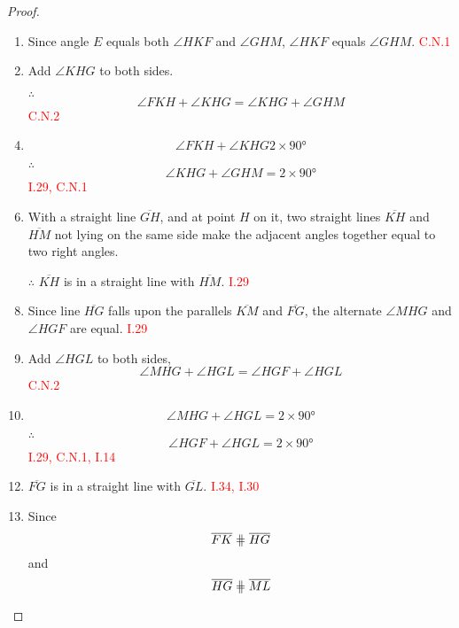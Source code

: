 \begin{proof}
\begin{enumerate}
    \item Since angle $E$ equals both $\angle{HKF}$ and $\angle{GHM}$, $\angle{HKF}$ equals $\angle{GHM}$.\hfill\textcolor{red}{ C.N.1}
    
    \item Add $\angle{KHG}$ to both sides. 
    
    \item[$\therefore$] 
    \[\angle{FKH} + \angle{KHG} = \angle{KHG} + \angle{GHM}\]\hfill\textcolor{red}{ C.N.2}
    
   \item \[\angle{FKH} + \angle{KHG} 2\times\ang{90} \]
   
   \item[$\therefore$]
   \[\angle{KHG} + \angle{GHM} =2\times\ang{90}\]\hfill\textcolor{red}{ I.29, C.N.1}
 
 \clearpage
   
    \item With a straight line $\overline{GH}$, and at point $H$ on it, two straight lines $\overline{KH}$ and $\overline{HM}$ not lying on the same side make the adjacent angles together equal to two right angles. 
    
    \item[$\therefore$] $\overline{KH}$ is in a straight line with $\overline{HM}$.\hfill\textcolor{red}{ I.29}
    
    \item Since line $\overline{HG}$ falls upon the parallels $\overline{KM}$ and $\overline{FG}$, the alternate $\angle{MHG}$ and $\angle{HGF}$ are equal.\hfill\textcolor{red}{ I.29}
    
  \item Add $\angle{HGL}$ to both sides,
  \[\angle{MHG} + \angle{HGL} = \angle{HGF} + \angle{HGL}\]\hfill\textcolor{red}{C.N.2}
  
  \item \[\angle{MHG} + \angle{HGL} = 2\times\ang{90}\]
  
  \item[$\therefore$]
   \[\angle{HGF} + \angle{HGL} =2\times\ang{90}\]\hfill\textcolor{red}{ I.29, C.N.1, I.14}
   
    \item $\overline{FG}$ is in a straight line with $\overline{GL}$.\hfill\textcolor{red}{ I.34, I.30}
    
    \item Since \[\overline{FK} \eqparallel \overline{HG}\] 
    and 
    \[\overline{HG} \eqparallel \overline{ML}\]
    

\end{enumerate}
\end{proof}
